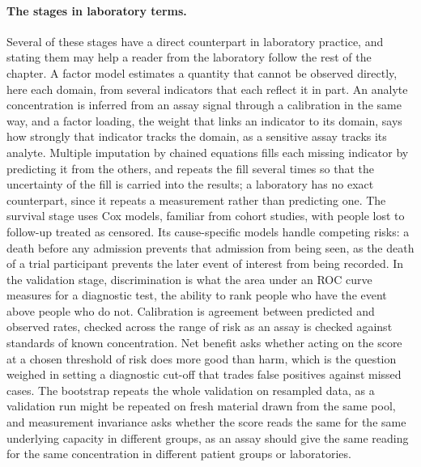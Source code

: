 \paragraph{The stages in laboratory terms.} Several of these stages have a
direct counterpart in laboratory practice, and stating them may help a reader
from the laboratory follow the rest of the chapter. A factor model estimates a
quantity that cannot be observed directly, here each domain, from several
indicators that each reflect it in part. An analyte concentration is inferred
from an assay signal through a calibration in the same way, and a factor
loading, the weight that links an indicator to its domain, says how strongly
that indicator tracks the domain, as a sensitive assay tracks its analyte.
Multiple imputation by chained equations fills each missing indicator by
predicting it from the others, and repeats the fill several times so that the
uncertainty of the fill is carried into the results; a laboratory has no exact
counterpart, since it repeats a measurement rather than predicting one. The
survival stage uses Cox models, familiar from cohort studies, with people lost
to follow-up treated as censored. Its cause-specific models handle competing
risks: a death before any admission prevents that admission from being seen,
as the death of a trial participant prevents the later event of interest from
being recorded. In the validation stage, discrimination is what the area under
an ROC curve measures for a diagnostic test, the ability to rank people who
have the event above people who do not. Calibration is agreement between
predicted and observed rates, checked across the range of risk as an assay is
checked against standards of known concentration. Net benefit asks whether
acting on the score at a chosen threshold of risk does more good than harm,
which is the question weighed in setting a diagnostic cut-off that trades
false positives against missed cases. The bootstrap repeats the whole
validation on resampled data, as a validation run might be repeated on fresh
material drawn from the same pool, and measurement invariance asks whether the
score reads the same for the same underlying capacity in different groups, as
an assay should give the same reading for the same concentration in different
patient groups or laboratories.

